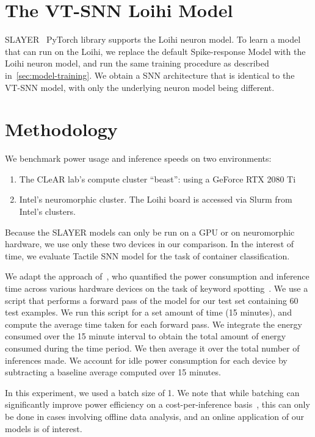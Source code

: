 \documentclass[fyp]{socreport}
\begin{document}
\section{The VT-SNN Loihi Model}

SLAYER~\cite{NIPS2018_7415} PyTorch library supports the Loihi neuron model. To
learn a model that can run on the Loihi, we replace the default Spike-response
Model with the Loihi neuron model, and run the same training procedure as
described in~\autoref{sec:model-training}. We obtain a SNN architecture that is
identical to the VT-SNN model, with only the underlying neuron model being
different.

\section{Methodology}
We benchmark power usage and inference speeds on two environments:

\begin{enumerate}
  \item The CLeAR lab's compute cluster ``beast'': using a GeForce RTX 2080 Ti
  \item Intel's neuromorphic cluster. The Loihi board is accessed via Slurm from
    Intel's clusters.
\end{enumerate}

Because the SLAYER models can only be run on a GPU or on neuromorphic hardware,
we use only these two devices in our comparison. In the interest of time, we
evaluate Tactile SNN model for the task of container classification.

We adapt the approach
of~\citeauthor{blouw18_bench_keywor_spott_effic_neurom_hardw}, who quantified
the power consumption and inference time across various hardware devices on the
task of keyword spotting~\cite{blouw18_bench_keywor_spott_effic_neurom_hardw}.
We use a script that performs a forward pass of the model for our test set
containing 60 test examples. We run this script for a set amount of time (15
minutes), and compute the average time taken for each forward pass. We integrate
the energy consumed over the 15 minute interval to obtain the total amount of
energy consumed during the time period. We then average it over the total number
of inferences made. We account for idle power consumption for each device by
subtracting a baseline average computed over 15 minutes.

In this experiment, we used a batch size of 1. We note that while batching can
significantly improve power efficiency on a cost-per-inference
basis~\cite{blouw18_bench_keywor_spott_effic_neurom_hardw}, this can only be
done in cases involving offline data analysis, and an online application of our
models is of interest.
\end{document}
